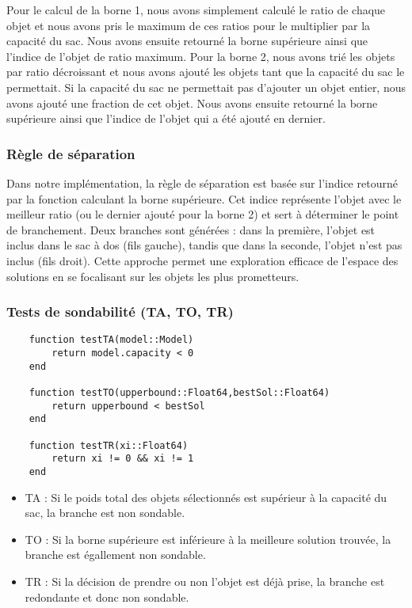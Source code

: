 Pour le calcul de la borne 1, nous avons simplement calculé le ratio de chaque objet et nous avons pris le maximum de ces ratios pour le multiplier par la capacité du sac. Nous avons ensuite retourné la borne supérieure ainsi que l'indice de l'objet de ratio maximum.
Pour la borne 2, nous avons trié les objets par ratio décroissant et nous avons ajouté les objets tant que la capacité du sac le permettait. Si la capacité du sac ne permettait pas d'ajouter un objet entier, nous avons ajouté une fraction de cet objet. Nous avons ensuite retourné la borne supérieure ainsi que l'indice de l'objet qui a été ajouté en dernier.

\subsubsection{Règle de séparation}
Dans notre implémentation, la règle de séparation est basée sur l'indice retourné par la fonction calculant la borne supérieure. Cet indice représente l'objet avec le meilleur ratio (ou le dernier ajouté pour la borne 2) et sert à déterminer le point de branchement. Deux branches sont générées : dans la première, l'objet est inclus dans le sac à dos (fils gauche), tandis que dans la seconde, l'objet n'est pas inclus (fils droit). Cette approche permet une exploration efficace de l'espace des solutions en se focalisant sur les objets les plus prometteurs.

\subsubsection{Tests de sondabilité (TA, TO, TR)}

\begin{lstlisting}
    function testTA(model::Model)
        return model.capacity < 0
    end
    
    function testTO(upperbound::Float64,bestSol::Float64)
        return upperbound < bestSol
    end
    
    function testTR(xi::Float64)
        return xi != 0 && xi != 1
    end
\end{lstlisting}

\begin{itemize}
        \item TA : Si le poids total des objets sélectionnés est supérieur à la capacité du sac, la branche est non sondable.
        \item TO : Si la borne supérieure est inférieure à la meilleure solution trouvée, la branche est égallement non sondable.
        \item TR : Si la décision de prendre ou non l'objet est déjà prise, la branche est redondante et donc non sondable.
\end{itemize}

